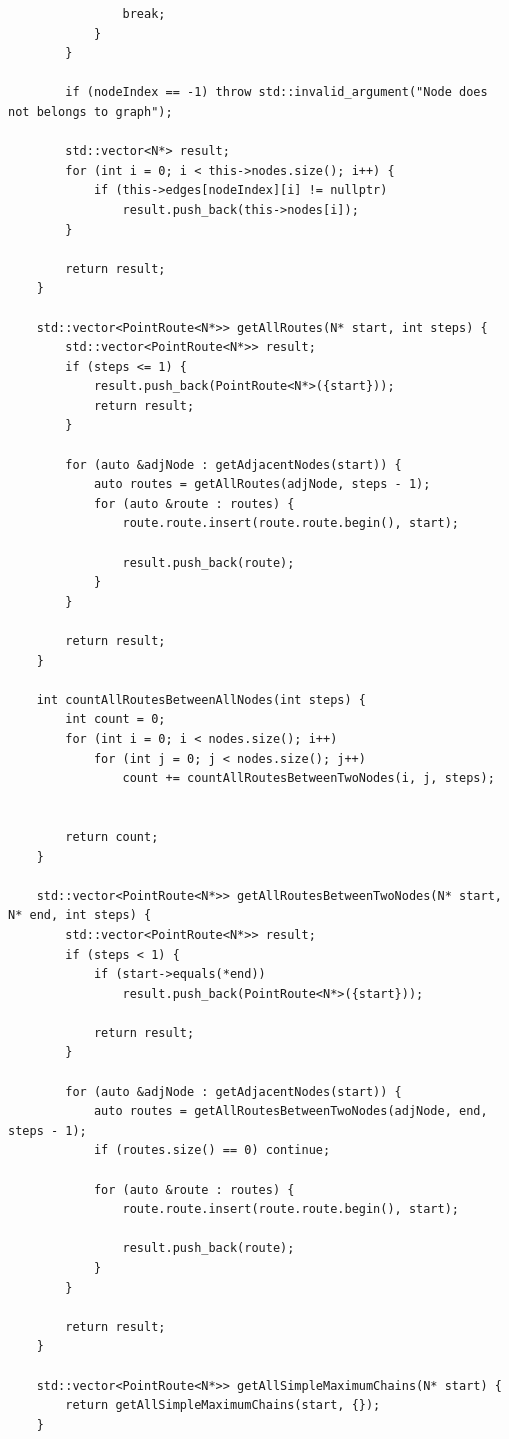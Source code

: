 \documentclass[a4paper,14pt]{extarticle}
\begin{document}
\begin{enumerate}[1.]
\begin{verbatim}
                break;
            }
        }

        if (nodeIndex == -1) throw std::invalid_argument("Node does not belongs to graph");

        std::vector<N*> result;
        for (int i = 0; i < this->nodes.size(); i++) {
            if (this->edges[nodeIndex][i] != nullptr)
                result.push_back(this->nodes[i]);
        }

        return result;
    }

    std::vector<PointRoute<N*>> getAllRoutes(N* start, int steps) {
        std::vector<PointRoute<N*>> result;
        if (steps <= 1) {
            result.push_back(PointRoute<N*>({start}));
            return result;
        }

        for (auto &adjNode : getAdjacentNodes(start)) {
            auto routes = getAllRoutes(adjNode, steps - 1);
            for (auto &route : routes) {
                route.route.insert(route.route.begin(), start);

                result.push_back(route);
            }
        }

        return result;
    }

    int countAllRoutesBetweenAllNodes(int steps) {
        int count = 0;
        for (int i = 0; i < nodes.size(); i++)
            for (int j = 0; j < nodes.size(); j++) 
                count += countAllRoutesBetweenTwoNodes(i, j, steps);


        return count;
    }

    std::vector<PointRoute<N*>> getAllRoutesBetweenTwoNodes(N* start, N* end, int steps) {
        std::vector<PointRoute<N*>> result;
        if (steps < 1) {
            if (start->equals(*end))
                result.push_back(PointRoute<N*>({start}));
            
            return result;
        }

        for (auto &adjNode : getAdjacentNodes(start)) {
            auto routes = getAllRoutesBetweenTwoNodes(adjNode, end, steps - 1);
            if (routes.size() == 0) continue;
            
            for (auto &route : routes) {
                route.route.insert(route.route.begin(), start);

                result.push_back(route);
            }
        }

        return result;
    }

    std::vector<PointRoute<N*>> getAllSimpleMaximumChains(N* start) {
        return getAllSimpleMaximumChains(start, {});
    }


\end{verbatim}
\end{enumerate}
\end{document}
